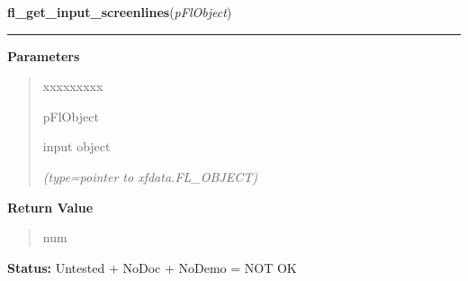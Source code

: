 \hspace{.8\funcindent}\begin{boxedminipage}{\funcwidth}

    \raggedright \textbf{fl\_get\_input\_screenlines}(\textit{pFlObject})

    \vspace{-1.5ex}

    \rule{\textwidth}{0.5\fboxrule}
\setlength{\parskip}{2ex}
\setlength{\parskip}{1ex}
      \textbf{Parameters}
      \vspace{-1ex}

      \begin{quote}
        \begin{Ventry}{xxxxxxxxx}

          \item[pFlObject]

          input object

            {\it (type=pointer to xfdata.FL\_OBJECT)}

        \end{Ventry}

      \end{quote}

      \textbf{Return Value}
    \vspace{-1ex}

      \begin{quote}
      num

      \end{quote}

\textbf{Status:} Untested + NoDoc + NoDemo = NOT OK



    \end{boxedminipage}

    \label{xformslib:flinput:fl_get_input_cursorpos}

    \vspace{0.5ex}

